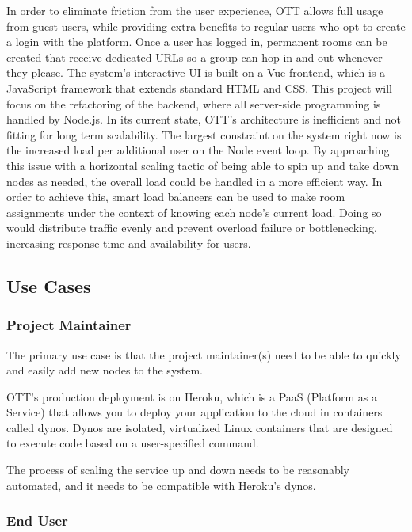 In order to eliminate friction from the user experience, OTT allows full usage from guest users, while providing extra benefits to regular users who opt to create a login with the platform. Once a user has logged in, permanent rooms can be created that receive dedicated URLs so a group can hop in and out whenever they please. The system’s interactive UI is built on a Vue frontend, which is a JavaScript framework that extends standard HTML and CSS. This project will focus on the refactoring of the backend, where all server-side programming is handled by Node.js. In its current state, OTT’s architecture is inefficient and not fitting for long term scalability. The largest constraint on the system right now is the increased load per additional user on the Node event loop. By approaching this issue with a horizontal scaling tactic of being able to spin up and take down nodes as needed, the overall load could be handled in a more efficient way. In order to achieve this, smart load balancers can be used to make room assignments under the context of knowing each node’s current load. Doing so would distribute traffic evenly and prevent overload failure or bottlenecking, increasing response time and availability for users.


\subsection{Use Cases}

\subsubsection{Project Maintainer}

The primary use case is that the project maintainer(s) need to be able to quickly and easily add new nodes to the system.

OTT's production deployment is on Heroku, which is a PaaS (Platform as a Service) that allows you to deploy your application to the
cloud in containers called dynos. Dynos are isolated, virtualized Linux containers that are designed to execute code based on a
user-specified command.

The process of scaling the service up and down needs to be reasonably automated, and it needs to be compatible with Heroku's dynos.

\subsubsection{End User}


